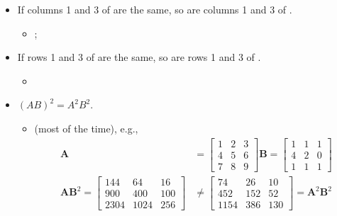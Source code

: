 \begin{itemize}
\begin{itemize}
{\begin{itemize}
        \item If columns 1 and 3 of  are the same, so are columns 1 and 3 of .
          \begin{itemize}
            \item {};
          \end{itemize}

        \item If rows 1 and 3 of  are the same, so are rows 1 and 3 of .
          \begin{itemize}
            \item {}
          \end{itemize}

        \item \((AB)^2 = A^2B^2\).
          \begin{itemize}\color{foreground}
            \item {} (most of the time), e.g.,
              \begin{align*}
                \bm{A} &=\begin{bmatrix}
                1 & 2 & 3 \\
                4 & 5 & 6 \\
                7 & 8 & 9
                \end{bmatrix}
                \bm{B} = \begin{bmatrix}
                1 & 1 & 1 \\
                4 & 2 & 0 \\
                1 & 1 & 1
                \end{bmatrix} \\
                  \bm{AB}^2 =
                \begin{bmatrix}
                144 & 64 & 16 \\
                900 & 400 & 100 \\
                2304 & 1024 & 256
                \end{bmatrix}
                       &\neq
                \begin{bmatrix}
                74 & 26 & 10 \\
                452 & 152 & 52 \\
                1154 & 386 & 130
                \end{bmatrix} =
               \bm{A}^2 \bm{B}^2
              \end{align*}
          \end{itemize}


\end{itemize}}
\end{itemize}
\end{itemize}
